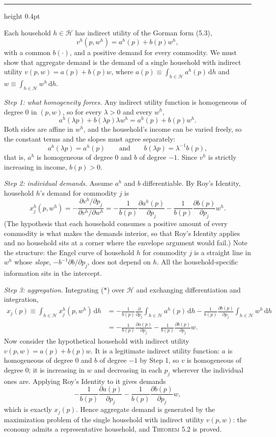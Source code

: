 \documentclass[11pt,letterpaper,reqno]{amsart}
\makeatletter
\newcommand{\dd}{\,\mathrm{d}}
\newcommand{\as@head}[3]{%
  \par\addvspace{1.6ex}\penalty-200\relax
  \phantomsection
  \addcontentsline{toc}{subsection}{#1 #2\texorpdfstring{\ifx\relax#3\relax\else\quad #3\fi}{}}%
  {\color{RuleGrey}\hrule height 0.4pt}%
  \nobreak\vspace{0.8ex}\nobreak
  \noindent{\bfseries #1 #2}%
  \ifx\relax#3\relax\else\quad{\bfseries\itshape #3}\fi
  \par\nobreak\vspace{0.4ex}\nobreak
  \as@beginstatement
}
\newcommand{\as@beginstatement}{\begingroup\itshape\ignorespaces}
\newenvironment{aex}[2]{\as@head{Exercise}{#1}{#2}}{\par\addvspace{1.2ex}}
\newcommand{\bk}[1]{\textup{\textsc{#1}}}
\renewcommand{\as@beginstatement}{\ignorespaces}
\makeatother
\begin{document}
\begin{aex}{5.3}{}
Each household $h\in\mathcal H$ has indirect utility of the Gorman form \bk{(5.3)},
\[
v^h(p,w^h)=a^h(p)+b(p)w^h ,
\]
with a common $b(\cdot)$, and a positive demand for every commodity.  We must show that aggregate demand is
the demand of a single household with indirect utility $v(p,w)=a(p)+b(p)w$, where
$a(p)\equiv\int_{h\in\mathcal H}a^h(p)\dd h$ and $w\equiv\int_{h\in\mathcal H}w^h\dd h$.

\emph{Step 1: what homogeneity forces.}  Any indirect utility function is homogeneous of degree $0$ in
$(p,w)$, so for every $\lambda>0$ and every $w^h$,
\[
a^h(\lambda p)+b(\lambda p)\lambda w^h=a^h(p)+b(p)w^h .
\]
Both sides are affine in $w^h$, and the household's income can be varied freely, so the constant terms and
the slopes must agree separately:
\[
a^h(\lambda p)=a^h(p)
\qquad\text{and}\qquad
b(\lambda p)=\lambda^{-1}b(p) ,
\]
that is, $a^h$ is homogeneous of degree $0$ and $b$ of degree $-1$.  Since $v^h$ is strictly increasing in
income, $b(p)>0$.

\emph{Step 2: individual demands.}  Assume $a^h$ and $b$ differentiable.  By Roy's Identity, household
$h$'s demand for commodity $j$ is
\[
x^h_j(p,w^h)
=-\frac{\partial v^h/\partial p_j}{\partial v^h/\partial w^h}
=-\frac{1}{b(p)}\frac{\partial a^h(p)}{\partial p_j}
-\frac{1}{b(p)}\frac{\partial b(p)}{\partial p_j}w^h .
\tag{$*$}
\]
(The hypothesis that each household consumes a positive amount of every commodity is what makes the
demands interior, so that Roy's Identity applies and no household sits at a corner where the envelope
argument would fail.)  Note the structure: the Engel curve of household $h$ for commodity $j$ is a straight
line in $w^h$ whose \emph{slope}, $-b^{-1}\partial b/\partial p_j$, does not depend on $h$.  All the
household-specific information sits in the intercept.

\emph{Step 3: aggregation.}  Integrating ($*$) over $\mathcal H$ and exchanging differentiation and
integration,
\begin{align*}
x_j(p)\equiv\int_{h\in\mathcal H}x^h_j(p,w^h)\dd h
&=-\frac{1}{b(p)}\frac{\partial}{\partial p_j}\int_{h\in\mathcal H}a^h(p)\dd h
-\frac{1}{b(p)}\frac{\partial b(p)}{\partial p_j}\int_{h\in\mathcal H}w^h\dd h\\
&=-\frac{1}{b(p)}\frac{\partial a(p)}{\partial p_j}-\frac{1}{b(p)}\frac{\partial b(p)}{\partial p_j}w .
\end{align*}
Now consider the hypothetical household with indirect utility $v(p,w)=a(p)+b(p)w$.  It is a legitimate
indirect utility function: $a$ is homogeneous of degree $0$ and $b$ of degree $-1$ by Step 1, so $v$ is
homogeneous of degree $0$; it is increasing in $w$ and decreasing in each $p_j$ wherever the individual
ones are.  Applying Roy's Identity to it gives demands
\[
-\frac{1}{b(p)}\frac{\partial a(p)}{\partial p_j}-\frac{1}{b(p)}\frac{\partial b(p)}{\partial p_j}w ,
\]
which is exactly $x_j(p)$.  Hence aggregate demand is generated by the maximization problem of the single
household with indirect utility $v(p,w)$: the economy admits a representative household, and
\bk{Theorem 5.2} is proved.


\end{aex}
\end{document}
